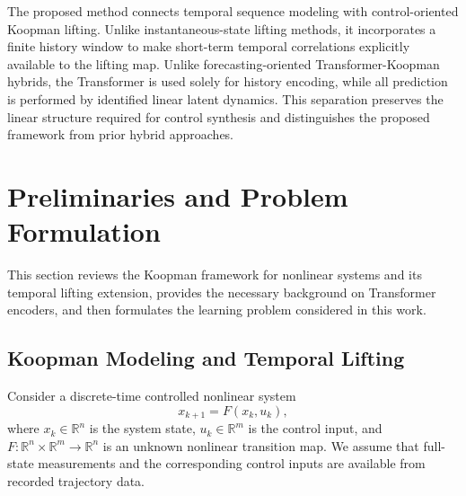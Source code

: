 \documentclass[journal]{IEEEtran}
\begin{document}
The proposed method connects temporal sequence modeling with control-oriented Koopman lifting. Unlike instantaneous-state lifting methods, it incorporates a finite history window to make short-term temporal correlations explicitly available to the lifting map. Unlike forecasting-oriented Transformer-Koopman hybrids, the Transformer is used solely for history encoding, while all prediction is performed by identified linear latent dynamics. This separation preserves the linear structure required for control synthesis and distinguishes the proposed framework from prior hybrid approaches.

\section{Preliminaries and Problem Formulation}
\label{sec:preliminaries_and_problem}

This section reviews the Koopman framework for nonlinear systems and its temporal lifting extension, provides the necessary background on Transformer encoders, and then formulates the learning problem considered in this work.

\subsection{Koopman Modeling and Temporal Lifting}
\label{sec:preliminary}

Consider a discrete-time controlled nonlinear system
\begin{equation}
    x_{k+1} = F(x_k, u_k),
    \label{eq:nonlinear_system}
\end{equation}
where $x_k \in \mathbb{R}^n$ is the system state, $u_k \in \mathbb{R}^m$ is the control input, and $F:\mathbb{R}^n \times \mathbb{R}^m \to \mathbb{R}^n$ is an unknown nonlinear transition map. We assume that full-state measurements and the corresponding control inputs are available from recorded trajectory data.
\end{document}
